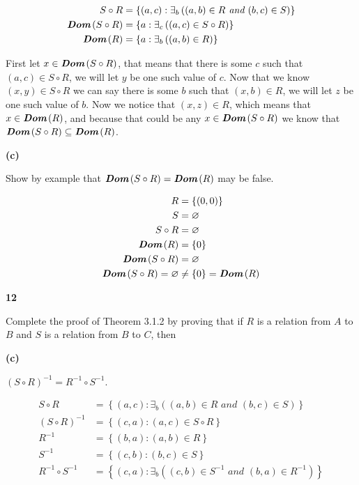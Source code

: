 \documentclass{article}
\newcommand{\sectionheading}[1]{\noindent\textbf{#1}

}
\let\emptyset\varnothing
\let\composed\circ
\def\And{\textit{ and }}
\newcommand{\set}[1]{\left\{ {#1} \right\}}
\newcommand{\setbuilder}[2]{\set{#1 : #2}}
\newcommand{\Exists}[2]{\exists_{#1}\left( {#2} \right)}
\newcommand{\domain}[1]{\textit{\textbf{Dom}}\left( #1 \right)}
\begin{document}
\begin{align*}
S \composed R &= \setbuilder{(a,c)}{\Exists{b}{(a,b) \in R \And (b,c) \in S}} \\
\domain{S \composed R} &= \setbuilder{a}{\Exists{c}{(a,c) \in S \composed R}} \\
\domain{R} &= \setbuilder{a}{\Exists{b}{(a,b) \in R}}
\end{align*}

First let $x \in \domain{S \composed R}$, that means that there is some $c$ such that $(a,c) \in S \composed R$, we will let $y$ be one such value of $c$. Now that we know $(x,y) \in S \composed R$ we can say there is some $b$ such that $(x,b)\in R$, we will let $z$ be one such value of $b$. Now we notice that $(x,z) \in R$, which means that $x\in\domain{R}$, and because that could be any $x\in\domain{S\composed R}$ we know that $\domain{S\composed R} \subseteq \domain{R}$.

\medskip
\sectionheading{(c)}
Show by example that $\domain{S \circ R} = \domain{R}$ may be false.

\begin{align*}
R &= \set {(0,0)} \\
S &= \emptyset \\
S \composed R &= \emptyset \\
\domain R &= \set 0 \\
\domain{S \composed R} &= \emptyset \\
\domain{S\composed R} = \emptyset &\not= \set 0 = \domain R
\end{align*}

\bigskip
\sectionheading{12}
Complete the proof of Theorem 3.1.2 by proving that if $R$ is a relation from $A$ to $B$ and $S$ is a relation from $B$ to $C$, then

\smallskip
\sectionheading{(c)}
$(S \composed R)^{-1}=R^{-1} \composed S^{-1}$.

\begin{align*}
S \composed R &= \setbuilder{(a,c)}{\Exists{b}{(a,b) \in R \And (b,c) \in S}} \\
(S\composed R)^{-1} &= \setbuilder{(c,a)}{(a,c)\in S\composed R} \\
R^{-1} &= \setbuilder{(b,a)}{(a,b)\in R} \\
S^{-1} &= \setbuilder{(c,b)}{(b,c)\in S} \\
R^{-1} \composed S^{-1} &= \setbuilder{(c,a)}{\Exists{b}{(c,b)\in S^{-1} \And (b,a) \in R^{-1}}}
\end{align*}
\end{document}
